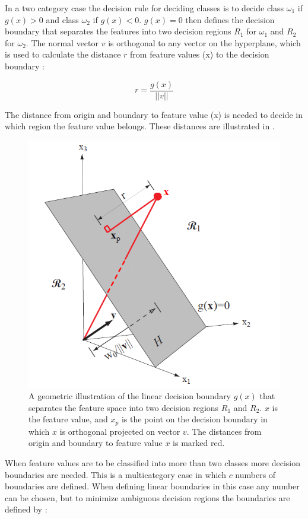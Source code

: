 In a two category case the decision rule for deciding classes is to decide class $\omega_1$ if $g(x) > 0$ and class $\omega_2$ if $g(x) < 0$. $g(x) = 0$ then defines the decision boundary that separates the features into two decision regions $R_1$ for $\omega_1$ and $R_2$ for $\omega_2$. The normal vector $v$ is orthogonal to any vector on the hyperplane, which is used to calculate the distance $r$ from feature values (x) to the decision boundary \cite{Duda2000}:

\begin{equation} \label{eq:featureValueDistance}
r = \frac{g(x)}{||v||}
\end{equation} 

The distance from origin and boundary to feature value (x) is needed to decide in which region the feature value belongs. \cite{Duda2000} These distances are illustrated in .

\begin{figure}[H]                 
	\includegraphics[width=.4\textwidth]{figures/xBackground/geolda}  
	\caption{A geometric illustration of the linear decision boundary $g(x)$ that separates the feature space into two decision regions $R_1$ and $R_2$. $x$ is the feature value, and $x_p$ is the point on the decision boundary in which $x$ is orthogonal projected on vector $v$. The distances from origin and boundary to feature value $x$ is marked red. \cite{Duda2000}}
	\label{fig:geolda} 
\end{figure}

When feature values are to be classified into more than two classes more decision boundaries are needed. This is a multicategory case in which $c$ numbers of boundaries are defined. When defining linear boundaries in this case any number can be chosen, but to minimize ambiguous decision regions the boundaries are defined by \cite{Duda2000}:

